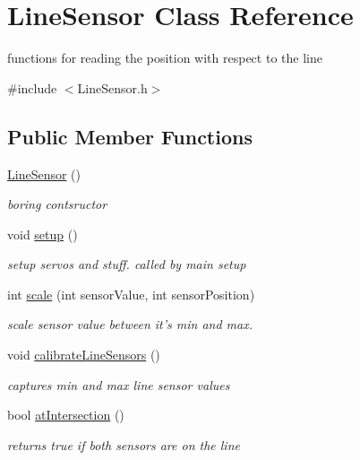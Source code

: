 \hypertarget{classLineSensor}{\section{Line\-Sensor Class Reference}
\label{classLineSensor}
}


functions for reading the position with respect to the line  




{\ttfamily \#include $<$Line\-Sensor.\-h$>$}

\subsection*{Public Member Functions}
\begin{DoxyCompactItemize}
\item 
\hyperlink{classLineSensor_af1f1d8c89ae0992f53b44c845cf7b9e1}{Line\-Sensor} ()
\begin{DoxyCompactList}\small\item\em boring contsructor \end{DoxyCompactList}\item 
void \hyperlink{classLineSensor_a555f6f7222ea1e76ed810edbde44c39c}{setup} ()
\begin{DoxyCompactList}\small\item\em setup servos and stuff. called by main setup \end{DoxyCompactList}\item 
int \hyperlink{classLineSensor_a71e0254f9f1e26734b551a124ea21ca3}{scale} (int sensor\-Value, int sensor\-Position)
\begin{DoxyCompactList}\small\item\em scale sensor value between it's min and max. \end{DoxyCompactList}\item 
void \hyperlink{classLineSensor_ab134af3ba9f3368a91e3f0e095c86b53}{calibrate\-Line\-Sensors} ()
\begin{DoxyCompactList}\small\item\em captures min and max line sensor values \end{DoxyCompactList}\item 
bool \hyperlink{classLineSensor_a6769cf781edb7ac4a43086cd62be01e2}{at\-Intersection} ()
\begin{DoxyCompactList}\small\item\em returns true if both sensors are on the line \end{DoxyCompactList}\item 

\end{DoxyCompactItemize}
